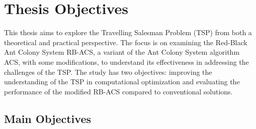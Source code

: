 
\section{Thesis Objectives}



This thesis aims to explore the Travelling Salesman Problem (TSP) from both a theoretical and practical perspective. The focus is on examining the Red-Black Ant Colony System \Gls{RB-ACS}, a variant of the Ant Colony System algorithm \Gls{ACS}, with some modifications, to understand its effectiveness in addressing the challenges of the \Gls{TSP}. The study has two objectives: improving the understanding of the \Gls{TSP} in computational optimization and evaluating the performance of the modified \Gls{RB-ACS} compared to conventional solutions.

\subsection{Main Objectives}

